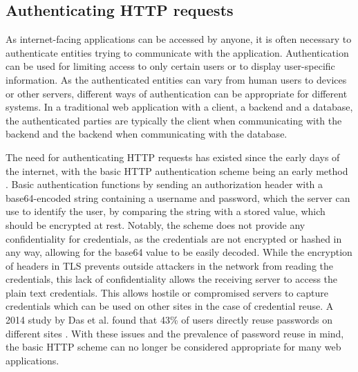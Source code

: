 \subsection{Authenticating HTTP requests}
As internet-facing applications can be accessed by anyone, it is often necessary to authenticate entities trying to communicate with the application.
Authentication can be used for limiting access to only certain users or to display user-specific information.
As the authenticated entities can vary from human users to devices or other servers, different ways of authentication can be appropriate for different systems.
In a traditional web application with a client, a backend and a database, the authenticated parties are typically the client when communicating with the backend and the backend when communicating with the database.

The need for authenticating HTTP requests has existed since the early days of the internet, with the basic HTTP authentication scheme being an early method \citep{reschke_basic_2015}. 
Basic authentication functions by sending an authorization header with a base64-encoded string containing a username and password, which the server can use to identify the user, by comparing the string with a stored value, which should be encrypted at rest.
Notably, the scheme does not provide any confidentiality for credentials, as the credentials are not encrypted or hashed in any way, allowing for the base64 value to be easily decoded.
While the encryption of headers in TLS prevents outside attackers in the network from reading the credentials, this lack of confidentiality allows the receiving server to access the plain text credentials.
This allows hostile or compromised servers to capture credentials which can be used on other sites in the case of credential reuse.
A 2014 study by Das et al. found that 43\% of users directly reuse passwords on different sites \citep{das_tangled_2014}.
With these issues and the prevalence of password reuse in mind, the basic HTTP scheme can no longer be considered appropriate for many web applications.

